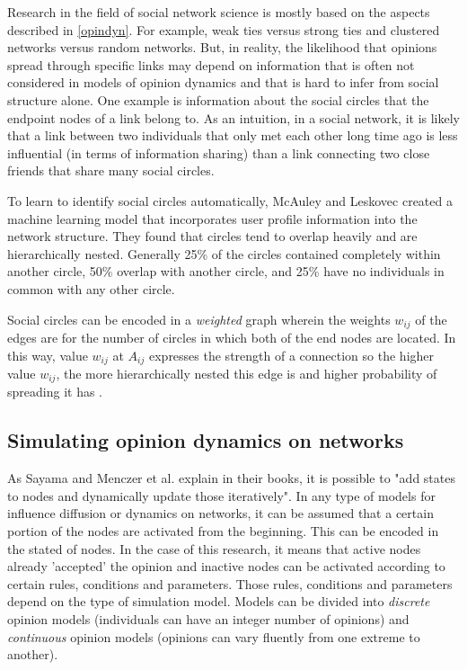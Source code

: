 Research in the field of social network science is mostly based on the aspects described in \ref{opindyn}. For example, weak ties versus strong ties and clustered networks versus random networks. But, in reality, the likelihood that opinions spread through specific links may depend on information that is often not considered in models of opinion dynamics and that is hard to infer from social structure alone. One example is information about the social circles that the endpoint nodes of a link belong to. As an intuition, in a social network, it is likely that a link between two individuals that only met each other long time ago is less influential (in terms of information sharing) than a link connecting two close friends that share many social circles. 

To learn to identify social circles automatically, McAuley and Leskovec \cite{mcauley2012learning} created a machine learning model that incorporates user profile information into the network structure. They found that circles tend to overlap heavily and are hierarchically nested. Generally 25\% of the circles contained completely within another circle, 50\% overlap with another circle, and 25\% have no individuals in common with any other circle. 

Social circles can be encoded in a \textit{weighted} graph wherein the weights $w_{ij}$ of the edges are for the number of circles in which both of the end nodes are located. In this way, value $w_{ij}$ at $A_{ij}$ expresses the strength of a connection so the higher value $w_{ij}$, the more hierarchically nested this edge is and higher probability of spreading it has \cite{HermsenEndtoend}.



\subsection{Simulating opinion dynamics on networks}
As Sayama \cite{sayama_2020} and Menczer et al. \cite{menczer_fortunato_davis_2020} explain in their books, it is possible to "add states to nodes and dynamically update those iteratively". In any type of models for influence diffusion or dynamics on networks, it can be assumed that a certain portion of the nodes are activated from the beginning. This can be encoded in the stated of nodes. In the case of this research, it means that active nodes already 'accepted' the opinion and inactive nodes can be activated according to certain rules, conditions and parameters. Those rules, conditions and parameters depend on the type of simulation model. Models can be divided into \textit{discrete} opinion models (individuals can have an integer number of opinions) and \textit{continuous} opinion models (opinions can vary fluently from one extreme to another).

